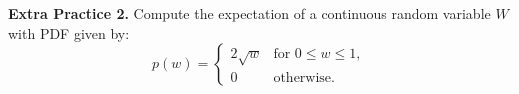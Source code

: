 \documentclass[10pt]{article}
\begin{document}
\newpage%

{\bf\color{blue}Extra Practice 2.}
Compute the expectation of a continuous random variable $W$ with PDF given by:
\[
p(w) = 
\begin{cases} 
2\sqrt{w} & \text{for } 0 \leq w \leq 1, \\
0 & \text{otherwise}.
\end{cases}
\]
\end{document}
